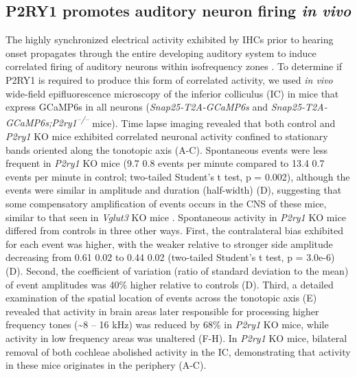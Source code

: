 \documentclass[9pt,lineno]{elife}
\begin{document}
\subsection{P2RY1 promotes auditory neuron firing \textit{in vivo}}
The highly synchronized electrical activity exhibited by IHCs prior to hearing onset propagates through the entire developing auditory system to induce correlated firing of auditory neurons within isofrequency zones \citep{Babola2018,Tritsch2010a}. To determine if P2RY1 is required to produce this form of correlated activity, we used \textit{in vivo} wide-field epifluorescence microscopy of the inferior colliculus (IC) in mice that express GCaMP6s in all neurons (\textit{Snap25-T2A-GCaMP6s} and \textit{Snap25-T2A-GCaMP6s;P2ry1\textsuperscript{–/–}} mice). Time lapse imaging revealed that both control and \textit{P2ry1} KO mice exhibited correlated neuronal activity confined to stationary bands oriented along the tonotopic axis (A-C). Spontaneous events were less frequent in \textit{P2ry1} KO mice (9.7 \textpm \hspace{0.2 mm} 0.8 events per minute compared to 13.4 \textpm \hspace{0.2 mm} 0.7 events per minute in control; two-tailed Student’s t test, p = 0.002), although the events were similar in amplitude and duration (half-width) (D), suggesting that some compensatory amplification of events occurs in the CNS of these mice, similar to that seen in \textit{Vglut3} KO mice \citep{Babola2018}. Spontaneous activity in \textit{P2ry1} KO mice differed from controls in three other ways. First, the contralateral bias exhibited for each event was higher, with the weaker relative to stronger side amplitude decreasing from 0.61 \textpm \hspace{0.2 mm} 0.02 to 0.44 \textpm \hspace{0.2 mm} 0.02  (two-tailed Student’s t test, p = 3.0e-6) (D). Second, the coefficient of variation (ratio of standard deviation to the mean) of event amplitudes was 40\% higher relative to controls (D). Third, a detailed examination of the spatial location of events across the tonotopic axis (E) revealed that activity in brain areas later responsible for processing higher frequency tones (\textasciitilde 8 -- 16 kHz) was reduced by 68\% in \textit{P2ry1} KO mice, while activity in low frequency areas was unaltered (F-H). In \textit{P2ry1} KO mice, bilateral removal of both cochleae abolished activity in the IC, demonstrating that activity in these mice originates in the periphery (A-C).
\end{document}
